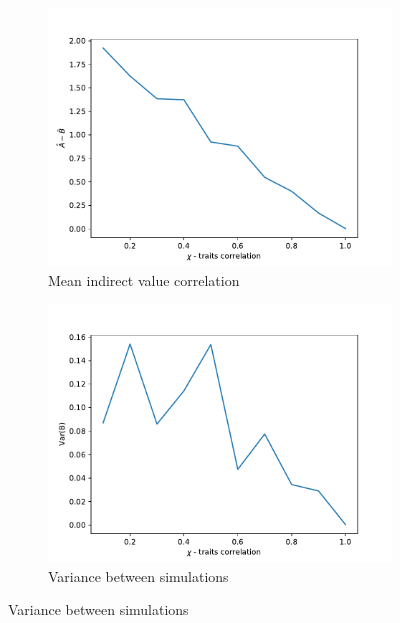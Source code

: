\documentclass[11pt]{article}
\begin{document}
 \begin{figure}
  \begin{subfigure}[b]{\linewidth}
    \includegraphics[width=\linewidth]{../../graphs/mean_indirect_correlation/mean_indirect_to_chi.pdf}
    \caption{Mean indirect value correlation}
  \end{subfigure}
  \begin{subfigure}[b]{\linewidth}
    \includegraphics[width=\linewidth]{../../graphs/mean_indirect_correlation/variance_between_populations_indirect_to_chi.pdf}
    \caption{Variance between simulations}
  \end{subfigure}
\end{figure}
\end{document}
